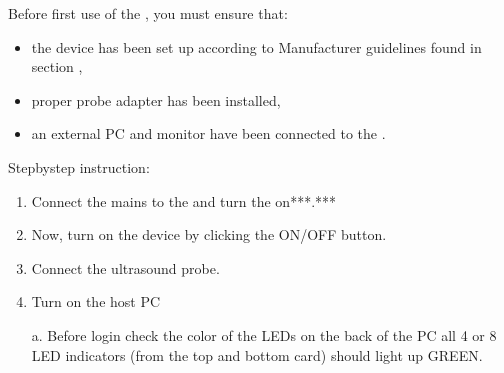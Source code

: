 \documentclass[letterpaper,10pt,english]{sphinxmanual}
\begin{document}
\sphinxAtStartPar
Before first use of the , you must ensure that:
\begin{itemize}
\item {} 
\sphinxAtStartPar
the device has been set up according to Manufacturer guidelines
found in section ,

\item {} 
\sphinxAtStartPar
proper probe adapter has been installed,

\item {} 
\sphinxAtStartPar
an external PC and monitor have been connected to the .

\end{itemize}

\sphinxAtStartPar
Step\sphinxhyphen{}by\sphinxhyphen{}step instruction:
\begin{enumerate}
%
\item {} 
\sphinxAtStartPar
Connect the mains to the  and turn the  on***.***

\item {} 
\sphinxAtStartPar
Now, turn on the device by clicking the ON/OFF button.

\item {} 
\sphinxAtStartPar
Connect the ultrasound probe.

\item {} 
\sphinxAtStartPar
Turn on the host PC

\sphinxAtStartPar
a.  Before login check the color of the LEDs on the back of the PC
\textendash{} all 4 or 8 LED indicators (from the top and bottom card)
should light up GREEN.

\end{enumerate}
\end{document}
